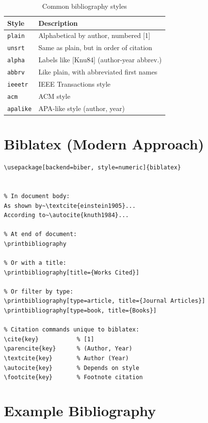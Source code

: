\begin{table}[H]
\centering
\begin{tabular}{ll}
\toprule
\textbf{Style} & \textbf{Description} \\
\midrule
\texttt{plain}    & Alphabetical by author, numbered [1] \\
\texttt{unsrt}    & Same as plain, but in order of citation \\
\texttt{alpha}    & Labels like [Knu84] (author-year abbrev.) \\
\texttt{abbrv}    & Like plain, with abbreviated first names \\
\texttt{ieeetr}   & IEEE Transactions style \\
\texttt{acm}      & ACM style \\
\texttt{apalike}  & APA-like style (author, year) \\
\bottomrule
\end{tabular}
\caption{Common bibliography styles}
\end{table}

\section{Biblatex (Modern Approach)}

\begin{lstlisting}[language={[LaTeX]TeX}, caption=biblatex package]
% In preamble:
\usepackage[backend=biber, style=numeric]{biblatex}


% In document body:
As shown by~\textcite{einstein1905}...
According to~\autocite{knuth1984}...

% At end of document:
\printbibliography

% Or with a title:
\printbibliography[title={Works Cited}]

% Or filter by type:
\printbibliography[type=article, title={Journal Articles}]
\printbibliography[type=book, title={Books}]

% Citation commands unique to biblatex:
\cite{key}           % [1]
\parencite{key}      % (Author, Year)
\textcite{key}       % Author (Year)
\autocite{key}       % Depends on style
\footcite{key}       % Footnote citation
\end{lstlisting}

\section{Example Bibliography}

